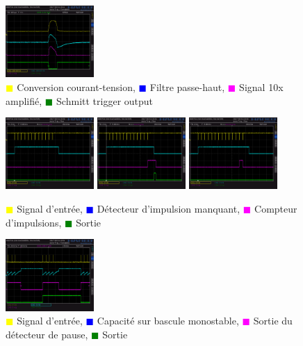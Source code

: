 \documentclass[french]{layout/Report}
\begin{document}
\begin{figure}[H]
\centering
\includegraphics[width=0.3\textwidth]{../measurements/SCR03}
\caption{
\textcolor{yellow}{$\blacksquare$} Conversion courant-tension,
\textcolor{blue}{$\blacksquare$} Filtre passe-haut,
\textcolor{magenta}{$\blacksquare$} Signal 10x amplifié,
\textcolor{green}{$\blacksquare$} Schmitt trigger output
}
\label{fig:filter_signal}
\end{figure}

\begin{figure}[H]
\centering
\includegraphics[width=0.3\textwidth]{../measurements/SCR06}
\includegraphics[width=0.3\textwidth]{../measurements/SCR07}
\includegraphics[width=0.3\textwidth]{../measurements/SCR08}
\caption{
\textcolor{yellow}{$\blacksquare$} Signal d'entrée,
\textcolor{blue}{$\blacksquare$} Détecteur d'impulsion manquant,
\textcolor{magenta}{$\blacksquare$} Compteur d'impulsions,
\textcolor{green}{$\blacksquare$} Sortie
}
\label{fig:decoder_signal}
\end{figure}

\begin{figure}[H]
\centering
\includegraphics[width=0.3\textwidth]{../measurements/SCR12}
\caption{
\textcolor{yellow}{$\blacksquare$} Signal d'entrée,
\textcolor{blue}{$\blacksquare$} Capacité sur bascule monostable,
\textcolor{magenta}{$\blacksquare$} Sortie du détecteur de pause,
\textcolor{green}{$\blacksquare$} Sortie
}
\label{fig:output_signal}
\end{figure}
\end{document}
